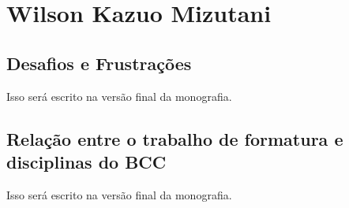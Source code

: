 \chapter{Wilson Kazuo Mizutani}
\label{sec:wil_subjetiva}

\section{Desafios e Frustrações}
\label{sec:wil:desafios_frustracoes}

Isso será escrito na versão final da monografia.

\section{Relação entre o trabalho de formatura e disciplinas do BCC}
\label{sec:wil:relacao_disciplinas_bcc}

Isso será escrito na versão final da monografia.
